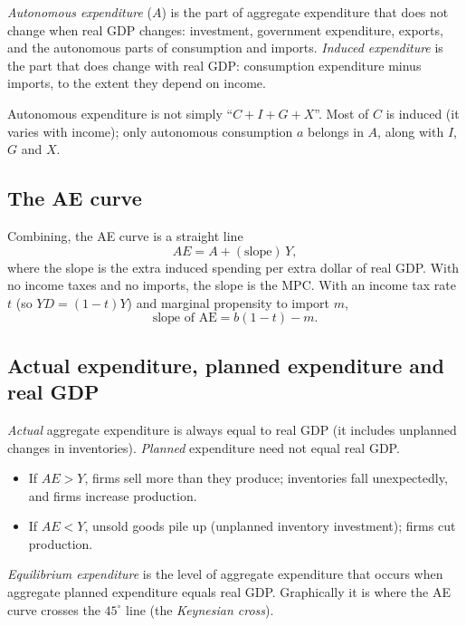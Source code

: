 \begin{definition}
\emph{Autonomous expenditure} ($A$) is the part of aggregate expenditure that does not
change when real GDP changes: investment, government expenditure, exports, and the
autonomous parts of consumption and imports. \emph{Induced expenditure} is the part that
does change with real GDP: consumption expenditure minus imports, to the extent they
depend on income.
\end{definition}

\begin{important}[Pitfall]
Autonomous expenditure is not simply ``$C + I + G + X$''. Most of $C$ is induced
(it varies with income); only autonomous consumption $a$ belongs in $A$, along with
$I$, $G$ and $X$.
\end{important}

\subsection{The AE curve}

Combining, the AE curve is a straight line
\[
  AE = A + (\text{slope})\,Y,
\]
where the slope is the extra induced spending per extra dollar of real GDP. With no
income taxes and no imports, the slope is the MPC. With an income tax rate $t$ (so
$YD = (1 - t)Y$) and marginal propensity to import $m$,
\[
  \text{slope of AE} = b(1 - t) - m.
\]

\subsection{Actual expenditure, planned expenditure and real GDP}

\emph{Actual} aggregate expenditure is always equal to real GDP (it includes unplanned
changes in inventories). \emph{Planned} expenditure need not equal real GDP.
\begin{itemize}
  \item If $AE > Y$, firms sell more than they produce; inventories fall unexpectedly,
        and firms increase production.
  \item If $AE < Y$, unsold goods pile up (unplanned inventory investment); firms cut
        production.
\end{itemize}

\begin{definition}
\emph{Equilibrium expenditure} is the level of aggregate expenditure that occurs when
aggregate planned expenditure equals real GDP. Graphically it is where the AE curve
crosses the $45^\circ$ line (the \emph{Keynesian cross}).
\end{definition}


